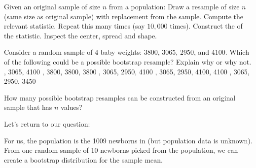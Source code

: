 Given an original sample of size $n$ from a population:
\bi
\ii Draw a resample of size $n$ (same size as original sample) with replacement from the sample. Compute the relevant statistic.
\ii Repeat this many times (say $10,\!000$ times).
\ii Construct the \textbf{} of the statistic. Inspect the center, spread and shape.
\ei
\ebox


\bb[resume]
\ii Consider a random sample of 4 baby weights: 3800, 3065, 2950, and 4100. Which of the following could be a possible bootstrap resample? Explain why or why not.
\bb
{}, 3065, 4100 \vfill
{}, 3800, 3800, 3800 \vfill
{}, 3065, 2950, 4100 \vfill
{}, 3065, 2950, 4100, 4100 \vfill
{}, 3065, 2950, 3450 \vfill
\ee

\ii How many possible bootstrap resamples can be constructed from an original sample that has $n$ values? \vfill
\ee


\clearpage


Let's return to our question: \textbf{}

\bi
\ii For us, the population is the 1009 newborns in \textit{\textbf{}} (but population data is unknown).
\ii From one random sample of 10 newborns picked from the population,  we can create a bootstrap distribution for the sample mean.
\ei

